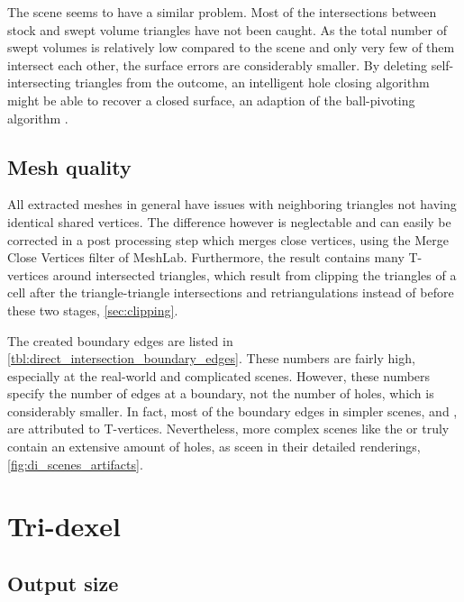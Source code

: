 The \turbine scene seems to have a similar problem.
Most of the intersections between stock and swept volume triangles have not been caught.
As the total number of swept volumes is relatively low compared to the \impeller scene and only very few of them intersect each other, the surface errors are considerably smaller.
By deleting self-intersecting triangles from the outcome, an intelligent hole closing algorithm might be able to recover a closed surface, \eg an adaption of the ball-pivoting algorithm \cite{bpa}.


\subsection{Mesh quality}

All extracted meshes in general have issues with neighboring triangles not having identical shared vertices.
The difference however is neglectable and can easily be corrected in a post processing step which merges close vertices, \eg using the Merge Close Vertices filter of MeshLab.
Furthermore, the result contains many T-vertices around intersected triangles, which result from clipping the triangles of a cell after the triangle-triangle intersections and retriangulations instead of before these two stages, \cf \cref{sec:clipping}.

The created boundary edges are listed in \cref{tbl:direct_intersection_boundary_edges}.
These numbers are fairly high, especially at the real-world and complicated scenes.
However, these numbers specify the number of edges at a boundary, not the number of holes, which is considerably smaller.
In fact, most of the boundary edges in simpler scenes, \eg \cylinders and \cylinderhead, are attributed to T-vertices.
Nevertheless, more complex scenes like the \impeller or \turbine truly contain an extensive amount of holes, as sceen in their detailed renderings, \cf \cref{fig:di_scenes_artifacts}.


\section{Tri-dexel}
\label{sec:tri_dexel_discussion}


\subsection {Output size}
\label{sec:tri_dexel_output_size}

